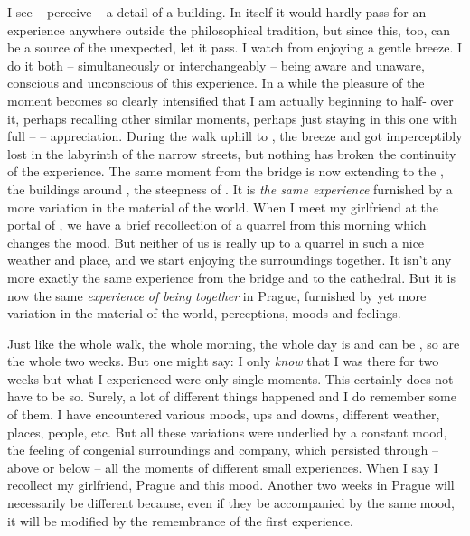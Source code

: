 I see -- perceive -- a detail of a building. In itself it would hardly pass for
an experience anywhere outside the philosophical tradition, but since this, too,
can be a source of the unexpected, let it pass.  I watch  from   enjoying a gentle breeze. I do it both --
simultaneously or interchangeably -- being aware and unaware, conscious and
unconscious of 
this experience. In a while the pleasure of the moment becomes so clearly
intensified that I am actually beginning to half- over it, perhaps
recalling other similar moments, perhaps just staying in this one with full --
 -- appreciation. During the walk uphill to , the
breeze and  got imperceptibly lost in the labyrinth of the narrow
streets, but nothing has broken the continuity of the experience. The same
moment from the bridge is now extending to the 
, the buildings around , the steepness of .  It is {\em
  the same experience} furnished by a more variation in the material of the
world. When I meet my girlfriend at the portal of , 
we have a brief recollection of a quarrel from this morning which changes the
mood. But neither of us is really up to a quarrel in such a nice weather and
place, and we start enjoying the surroundings together. It isn't any more exactly the
same experience from the bridge and to the cathedral. But it is
now the same {\em experience of being together} in Prague, furnished by yet more
variation in the material of the world, perceptions, moods and feelings.

\pa Just like the whole walk, the whole morning, the whole day
is  and can be , so are the whole two weeks.
But one might say: I only {\em know} that I was there for two weeks but what I
experienced were only single moments. This certainly does not have to be so.
Surely, a lot of different things happened and I do remember some of them. I
have encountered various moods, ups and downs, different weather, places, people, etc.
But all these variations were underlied by a constant mood, the feeling of
congenial surroundings and company, which persisted through -- above or below --
all the moments of different small experiences. When I say  I recollect my girlfriend, Prague and this mood.
Another two weeks in Prague will necessarily be different because, even if they
be accompanied by the same mood, it will be modified by the remembrance of the
first experience.

